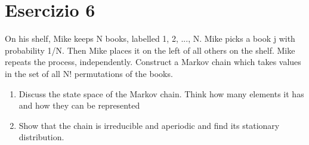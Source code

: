 \documentclass[
	12pt, %
]{fphw}
\begin{document}

\newpage
\section*{Esercizio 6}

\begin{problem}
	\smallskip
	On his shelf, Mike keeps N books, labelled 1, 2, ..., N. Mike picks
	a book j with probability 1/N. Then Mike places it on the left of all
	others on the shelf. Mike repeats the process, independently. Construct
	a Markov chain which takes values in the set of all N! permutations of
	the books.
	\begin{enumerate}
		\item Discuss the state space of the Markov chain. Think how many
		elements it has and how they can be represented
		\item Show that the chain is irreducible and aperiodic and find its
		stationary distribution.		
	\end{enumerate}
	\smallskip
\end{problem}
	
\end{document}
